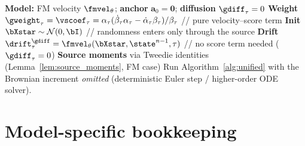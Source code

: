 \begin{algorithm}[ht]
\caption{Sampler 3 -- Guided probability-flow ODE (flow matching, deterministic)}
\label{alg:fm_ode}
\begin{algorithmic}[1]
\STATE \textbf{Model:} FM velocity $\fmvel_\theta$; \textbf{anchor} $\bm a_0=\bm 0$; \textbf{diffusion} $\gdiff_\tau=0$
\STATE \textbf{Weight} $\gweight_\tau = \vscoef_\tau = \alpha_\tau(\dot\beta_\tau\alpha_\tau-\dot\alpha_\tau\beta_\tau)/\beta_\tau$ \hfill // pure velocity--score term
\STATE \textbf{Init} $\bXstar\sim\mathcal{N}(0,\bI)$ \hfill // randomness enters only through the source
\STATE \textbf{Drift} $\drift^{\gdiff}_\tau=\fmvel_\theta(\bXstar,\state^{n-1},\tau)$ \hfill // no score term needed ($\gdiff_\tau=0$)
\STATE \textbf{Source moments} via Tweedie identities (Lemma~\ref{lem:source_moments}, FM case)
\STATE Run Algorithm~\ref{alg:unified} with the Brownian increment \emph{omitted} (deterministic Euler step / higher-order ODE solver).
\end{algorithmic}
\end{algorithm}

\section{Model-specific bookkeeping}\label{appendix:bookkeeping}

